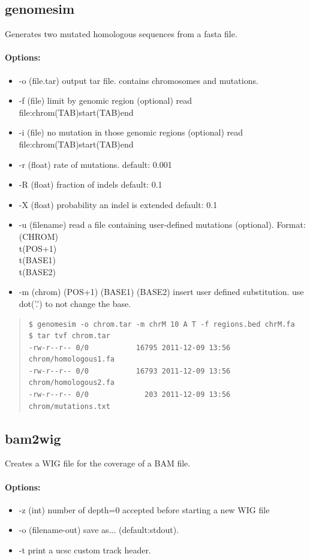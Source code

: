 \documentclass[12pt]{article}
\begin{document}
\subsection{genomesim}
Generates two mutated homologous sequences from a fasta file.
\paragraph{Options:}
\begin{itemize}
\item-o (file.tar) output tar file. contains chromosomes and mutations.
\item-f (file) limit by genomic region (optional) read file:chrom(TAB)start(TAB)end
\item-i (file) no mutation in those genomic regions (optional) read file:chrom(TAB)start(TAB)end
\item-r (float) rate of mutations. default: 0.001
\item-R (float) fraction of indels default: 0.1
\item-X (float)  probability an indel is extended default: 0.1
\item-u (filename) read a file containing user-defined mutations (optional). Format: (CHROM)\\t(POS+1)\\t(BASE1)\\t(BASE2)
\item-m (chrom) (POS+1) (BASE1) (BASE2) insert user defined substitution. use dot('.') to not change the base.
\end{itemize}

\begin{quote}
\begin{verbatim}
$ genomesim -o chrom.tar -m chrM 10 A T -f regions.bed chrM.fa
$ tar tvf chrom.tar 
-rw-r--r-- 0/0           16795 2011-12-09 13:56 chrom/homologous1.fa
-rw-r--r-- 0/0           16793 2011-12-09 13:56 chrom/homologous2.fa
-rw-r--r-- 0/0             203 2011-12-09 13:56 chrom/mutations.txt
\end{verbatim}
\end{quote}

\subsection{bam2wig}
Creates a WIG file for the coverage of a BAM file.
\paragraph{Options:}
\begin{itemize}
\item-z (int) number of depth=0 accepted before starting a new WIG file
\item-o (filename-out) save as... (default:stdout).
\item-t print a ucsc custom track header.
\end{itemize}
\end{document}
